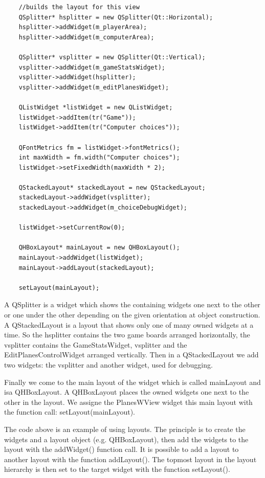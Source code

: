 \begin{lstlisting}


	//builds the layout for this view
	QSplitter* hsplitter = new QSplitter(Qt::Horizontal);
	hsplitter->addWidget(m_playerArea);
	hsplitter->addWidget(m_computerArea);
	
	QSplitter* vsplitter = new QSplitter(Qt::Vertical);
	vsplitter->addWidget(m_gameStatsWidget);
	vsplitter->addWidget(hsplitter);
	vsplitter->addWidget(m_editPlanesWidget);
	
	QListWidget *listWidget = new QListWidget;
	listWidget->addItem(tr("Game"));
	listWidget->addItem(tr("Computer choices"));
	
	QFontMetrics fm = listWidget->fontMetrics();
	int maxWidth = fm.width("Computer choices");
	listWidget->setFixedWidth(maxWidth * 2);
	
	QStackedLayout* stackedLayout = new QStackedLayout;
	stackedLayout->addWidget(vsplitter);
	stackedLayout->addWidget(m_choiceDebugWidget);
	
	listWidget->setCurrentRow(0);
	
	QHBoxLayout* mainLayout = new QHBoxLayout();
	mainLayout->addWidget(listWidget);
	mainLayout->addLayout(stackedLayout);
	
	setLayout(mainLayout);

\end{lstlisting}

A QSplitter is a widget which shows the containing widgets one next to the other or one under the other depending on the given orientation at object construction. A QStackedLayout is a layout that shows only one of many owned widgets at a time. So the hsplitter contains the two game boards arranged horizontally, the vsplitter contains the GameStatsWidget, vsplitter and the EditPlanesControlWidget arranged vertically. Then in a QStackedLayout we add two widgets: the vsplitter and another widget, used for debugging.

Finally we come to the main layout of the widget which is called mainLayout and isa QHBoxLayout. A QHBoxLayout places the owned widgets one next to the other in the layout. We assigne the PlanesWView widget this main layout with the function call: setLayout(mainLayout).

The code above is an example of using layouts. The principle is to create the widgets and a layout object (e.g. QHBoxLayout), then add the widgets to the layout with the addWidget() function call. It is possible to add a layout to another layout with the function addLayout(). The topmost layout in the layout hierarchy is then set to the target widget with the function setLayout().